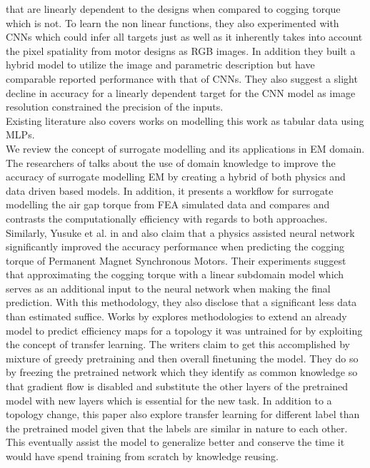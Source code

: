 \documentclass{report} %
\begin{document}
that are linearly dependent to the designs when compared to cogging torque which is not.
To learn the non linear functions, they also experimented with \ac{CNN}s which could infer all targets just as well as it inherently takes 
into account the pixel spatiality from motor designs as RGB images. In addition they built a hybrid model to utilize the image and parametric 
description but have comparable reported performance with that of \ac{CNN}s.
They also suggest a slight decline in accuracy for a linearly dependent target for the \ac{CNN} model as image resolution constrained the precision of the inputs.\\
Existing literature also covers works on modelling this work as tabular data using \ac{MLP}s. \\
We review the concept of surrogate modelling and its applications in \ac{EM} domain.
The researchers of \cite{SM EMT-2020} talks about the use of domain knowledge to improve the accuracy of surrogate modelling \ac{EM} by creating a hybrid of both 
physics and data driven based models.
In addition, it presents a workflow for surrogate modelling the air gap torque from \ac{FEA} simulated data and compares and contrasts the computationally efficiency with regards to both approaches. 
Similarly, Yusuke et al. in \cite{PANN-MT-2021} and \cite{PANN-MOO-2021} also claim that a physics assisted neural network significantly improved the accuracy performance when predicting the cogging torque 
of Permanent Magnet Synchronous Motors. Their experiments suggest that approximating the cogging torque with a linear subdomain model which serves as an additional 
input to the neural network when making the final prediction. With this methodology, they also disclose that a significant less data than estimated suffice.
Works by \cite{EM TL-2020} explores methodologies to extend an already model to predict efficiency maps for a topology it was untrained for by exploiting 
the concept of transfer learning. The writers claim to get this accomplished by mixture of greedy pretraining and then overall finetuning the model.
They do so by freezing the pretrained network which they identify as common knowledge so that gradient flow is disabled and substitute the other 
layers of the pretrained model with new layers which is essential for the new task.
In addition to a topology change, this paper also explore transfer learning for different label than the pretrained model given that the labels are similar in nature to each other. 
This eventually assist the model to generalize better and conserve the time it would have spend training from scratch by knowledge reusing. 
\end{document}
